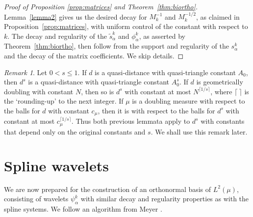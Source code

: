 \documentclass{amsart}
\numberwithin{equation}{section}
\theoremstyle{plain}
\theoremstyle{definition}
\theoremstyle{remark}
\newtheorem{remark}[equation]{Remark}
\begin{document}
{{{
\begin{proof}[Proof of Proposition \ref{prop:matrices} and Theorem~\ref{thm:biortho}]
Lemma~\ref{lemma2} gives us the desired decay for $M_{k}^{-1}$ and $M_{k}^{-1/2}$, as claimed in Proposition~\ref{prop:matrices}, with uniform control of the constant with respect to $k$. The decay and regularity of the $\tilde{s}^k_\alpha$ and $\phi^k_\alpha$, as asserted by Theorem~\ref{thm:biortho}, then follow from the support and regularity of the $s^k_\alpha$ and the decay of the matrix coefficients. We skip details.
\end{proof}
}

\begin{remark}\label{rem:ds}
Let  $0<s\le 1$. If $d$ is a quasi-distance with quasi-triangle constant $A_{0}$, then $d^s$ is a quasi-distance with quasi-triangle constant $A_{0}^s$.  If $d$ is geometrically doubling {with constant $N$, then so is $d^s$ with constant at most $N^{\lceil 1/s\rceil}$, where $\lceil\ \rceil$ is the `rounding-up' to the next integer. If $\mu$ is a doubling measure with respect to the balls for $d$ with constant $c_\mu$, then it is with respect to the balls for $d^s$ with constant at most $c_\mu^{\lceil 1/s\rceil}$. Thus both previous lemmata apply to $d^s$ with constants that depend only on the original constants and $s$.} We shall use this remark later.
\end{remark}

 
\section{Spline wavelets} 

We are now prepared for the construction of an orthonormal basis of $L^2(\mu)$, consisting of wavelets $\psi^k_\alpha$ with similar decay and regularity properties as with the spline systems. We follow an algorithm from Meyer \cite{M}.

}}
\end{document}
